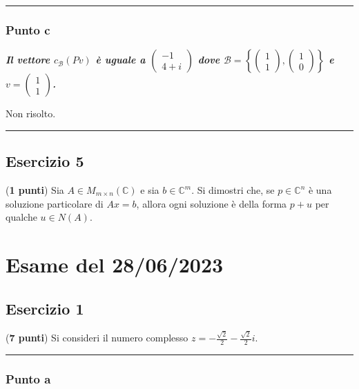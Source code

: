 \documentclass[a4paper]{article}
\newcommand{\longline}{\noindent\rule{\textwidth}{0.4pt}}
\begin{document}
	\longline
	
	\subsubsection{Punto c}
	
	\textcolor{Green4}{\textbf{\emph{Il vettore $c_{\mathcal{B}}\left(Pv\right)$ è uguale a $\begin{pmatrix}
		-1 \\ 4+i
	\end{pmatrix}$ dove $\mathcal{B} = \left\{\begin{pmatrix}
		1 \\ 1
	\end{pmatrix}, \begin{pmatrix}
		1 \\ 0
	\end{pmatrix}\right\}$ e $v = \begin{pmatrix}
		1 \\ 1
	\end{pmatrix}$.}}}\newline

	\noindent
	Non risolto.
	
	\longline
	
	\subsection{Esercizio 5}
	
	(\textbf{1 punti}) Sia $A \in M_{m\times n}\left(\mathbb{C}\right)$ e sia $b \in \mathbb{C}^{m}$. Si dimostri che, se $p \in \mathbb{C}^{n}$ è una soluzione particolare di $Ax = b$, allora ogni soluzione è della forma $p + u$ per qualche $u \in N\left(A\right)$.\newpage
	
	\section{Esame del 28/06/2023}
	
	\subsection{Esercizio 1}
	
	(\textbf{7 punti}) Si consideri il numero complesso $z = - \frac{\sqrt{2}}{2} - \frac{\sqrt{2}}{2}i$.
	
	\longline
	
	\subsubsection{Punto a}
	
\end{document}
